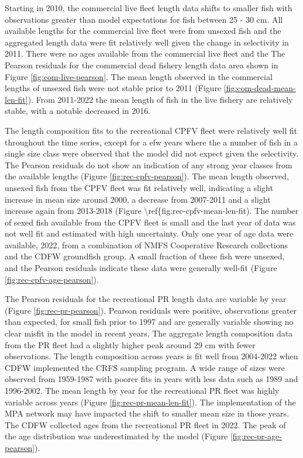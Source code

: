 \documentclass[11pt,
  english,
  letterpaper,
]{article}
\begin{document}
Starting in 2010, the commercial live fleet length data shifts to smaller fish with observations greater than model expectations for fish between 25 - 30 cm. All available lengths for the commercial live fleet were from unsexed fish and the aggregated length data were fit relatively well given the change in selectivity in 2011. There were no ages available from the commercial live fleet and the The Pearson residuals for the commercial dead fishery length data area shown in Figure \ref{fig:com-live-pearson}. The mean length observed in the commercial lengths of unsexed fish were not stable prior to 2011 (Figure \ref{fig:com-dead-mean-len-fit}). From 2011-2022 the mean length of fish in the live fishery are relatively stable, with a notable decreased in 2016.

The length composition fits to the recreational CPFV fleet were relatively well fit throughout the time series, except for a efw years where the a number of fish in a single size class were observed that the model did not expect given the selectivity. The Pearson residuals do not show an indication of any strong year classes from the available lengths (Figure \ref{fig:rec-cpfv-pearson}). The mean length observed, unsexed fish from the CPFV fleet was fit relatively well, indicating a slight increase in mean size around 2000, a decrease from 2007-2011 and a slight increase again from 2013-2018 (Figure \textbackslash ref\{fig:rec-cpfv-mean-len-fit). The number of sexed fish available from the CPFV fleet is small and the last year of data was not well fit and estimated with high uncertainty. Only one year of age data were available, 2022, from a combination of NMFS Cooperative Research collections and the CDFW groundfish group. A small fraction of these fish were unsexed, and the Pearson residuals indicate these data were generally well-fit (Figure \ref{fig:rec-cpfv-age-pearson}).

The Pearson residuals for the recreational PR length data are variable by year (Figure \ref{fig:rec-pr-pearson}). Pearson residuals were positive, observations greater than expected, for small fish prior to 1997 and are generally variable showing no clear misfit in the model in recent years. The aggregate length composition data from the PR fleet had a slightly higher peak around 29 cm with fewer observations. The length composition across years is fit well from 2004-2022 when CDFW implemented the CRFS sampling program. A wide range of sizes were observed from 1959-1987 with poorer fits in years with less data such as 1989 and 1996-2002. The mean length by year for the recreational PR fleet was highly variable across years (Figure \ref{fig:rec-pr-mean-len-fit}). The implementation of the MPA network may have impacted the shift to smaller mean size in those years. The CDFW collected ages from the recreational PR fleet in 2022. The peak of the age distribution was underestimated by the model (Figure \ref{fig:rec-pr-age-pearson}).
\end{document}
